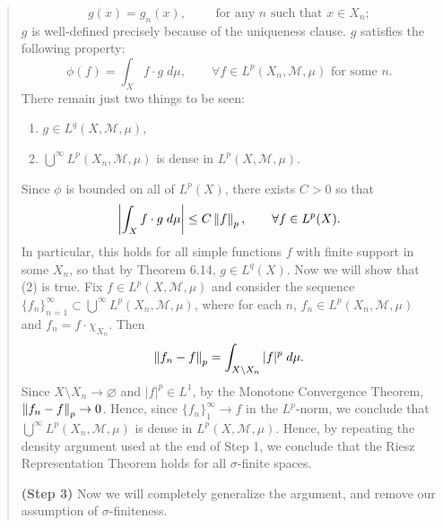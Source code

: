 \documentclass{article}
\begin{document}
\begin{itemize}
\begin{quote}
\begin{solutions}
			\begin{equation}
				g(x) = g_{n}(x), \qquad \text{ for any $n$ such that $x \in X_{n}$};
			\end{equation}
			$g$ is well-defined precisely because of the uniqueness clause. $g$ satisfies the following property:
			\begin{equation}
				\phi(f) = \int_{X}f\cdot g \;d\mu, \qquad \forall f \in L^{p}(X_{n}, \mathscr{M}, \mu) \text{ for some $n$}.
			\end{equation}
			There remain just two things to be seen: \vspace{-0.15cm}
			\begin{enumerate}[itemsep =-2pt,label = (\arabic{*})]
				\item $g \in L^{q}(X, \mathscr{M}, \mu)$, 
				\item $\bigcup^{\infty}L^{p}(X_{n}, \mathscr{M}, \mu)$ is dense in $L^{p}(X, \mathscr{M}, \mu)$. 
			\end{enumerate}
			Since $\phi$ is bounded on all of $L^{p}(X)$, there exists $C > 0$ so that 
			\begin{equation}
				\left| \int_{X}f\cdot g\;d\mu \right| \leq C \left\Vert f \right\Vert_{p}, \qquad \forall f \in L^{p}(X). 
			\end{equation}
			In particular, this holds for all simple functions $f$ with finite support in some $X_{n}$, so that by Theorem 6.14, $g \in L^{q}(X)$. Now we will show that (2) is true. Fix $f \in L^{p}(X, \mathscr{M}, \mu)$ and consider the sequence $\{f_{n}\}_{n = 1}^{\infty} \subset \bigcup^{\infty}L^{p}(X_{n}, \mathscr{M}, \mu)$, where for each $n$, $f_{n} \in L^{p}(X_{n}, \mathscr{M}, \mu)$ and $f_{n} = f \cdot \chi_{X_{n}}$. Then 
			\begin{equation}
				\left\Vert f_{n} - f \right\Vert_{p} = \int_{X \setminus X_{n}}|f|^{p}\;d\mu. 
			\end{equation}
			Since $X\setminus X_{n} \to \varnothing$ and $|f|^{p} \in L^{1}$, by the Monotone Convergence Theorem, $\left\Vert f_{n} -f \right\Vert_{p} \to 0$. Hence, since $\{f_{n}\}_{1}^{\infty} \to f$ in the $L^{p}$-norm, we conclude that $\bigcup^{\infty}L^{p}(X_{n}, \mathscr{M}, \mu)$ is dense in $L^{p}(X, \mathscr{M}, \mu)$. Hence, by repeating the density argument used at the end of Step 1, we conclude that the Riesz Representation Theorem holds for all $\sigma$-finite spaces. 
		\end{solutions} 
		\textbf{(Step 3)} Now we will completely generalize the argument, and remove our assumption of $\sigma$-finiteness.\newline 

\end{quote}
\end{itemize}
\end{document}
